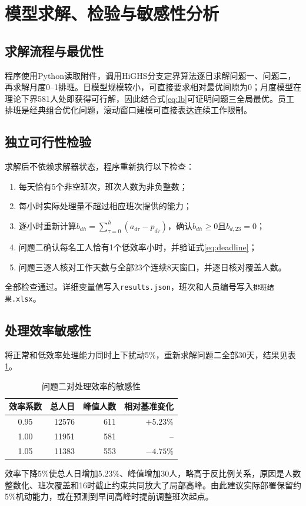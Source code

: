 \section{模型求解、检验与敏感性分析}

\subsection{求解流程与最优性}

程序使用Python读取附件，调用HiGHS分支定界算法逐日求解问题一、问题二，再求解月度0--1排班。日模型规模较小，可直接要求相对最优间隙为0；月度模型在理论下界581人处即获得可行解，因此结合式\eqref{eq:lb}可证明问题三全局最优。员工排班是经典组合优化问题，滚动窗口建模可直接表达连续工作限制\cite{ernst2004,pinedo2022}。

\subsection{独立可行性检验}

求解后不依赖求解器状态，程序重新执行以下检查：
\begin{enumerate}[label=\arabic*)]
  \item 每天恰有5个非空班次，班次人数为非负整数；
  \item 每小时实际处理量不超过相应班次提供的能力；
  \item 逐小时重新计算$b_{dh}=\sum_{\tau=0}^{h}(a_{d\tau}-p_{d\tau})$，确认$b_{dh}\ge0$且$b_{d,23}=0$；
  \item 问题二确认每名工人恰有1个低效率小时，并验证式\eqref{eq:deadline}；
  \item 问题三逐人核对工作天数与全部23个连续8天窗口，并逐日核对覆盖人数。
\end{enumerate}
全部检查通过。详细变量值写入\texttt{results.json}，班次和人员编号写入\texttt{排班结果.xlsx}。

\subsection{处理效率敏感性}

将正常和低效率处理能力同时上下扰动5\%，重新求解问题二全部30天，结果见表\ref{tab:sensitivity}。

\begin{table}[htbp]
\centering
\caption{问题二对处理效率的敏感性}
\label{tab:sensitivity}
\begin{tabular}{crrr}
\toprule
效率系数 & 总人日 & 峰值人数 & 相对基准变化\\
\midrule
0.95 & 12576 & 611 & $+5.23\%$\\
1.00 & 11951 & 581 & --\\
1.05 & 11383 & 553 & $-4.75\%$\\
\bottomrule
\end{tabular}
\end{table}

效率下降5\%使总人日增加5.23\%、峰值增加30人，略高于反比例关系，原因是人数整数化、班次覆盖和16时截止约束共同放大了局部高峰。由此建议实际部署保留约5\%机动能力，或在预测到早间高峰时提前调整班次起点。

